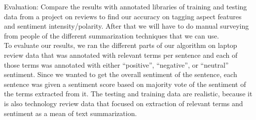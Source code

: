 \documentclass{article}
\begin{document}
Evaluation: Compare the results with annotated libraries of training and testing data from a project on reviews to find our accuracy on tagging aspect features and sentiment intensity/polarity.
After that we will have to do manual surveying from people of the different summarization techniques that we can use.
\newline \\
To evaluate our results, we ran the different parts of our algorithm on laptop review data that was annotated with relevant terms per sentence and each of those terms was annotated with either “positive”, 
“negative”, or “neutral” sentiment. Since we wanted to get the overall sentiment of the sentence, each sentence was given a sentiment score based on majority vote of the sentiment of the terms extracted from it. The testing and training data are realistic, because it is also technology review data that focused on extraction of relevant terms and sentiment as a mean of text summarization.  
\end{document}

